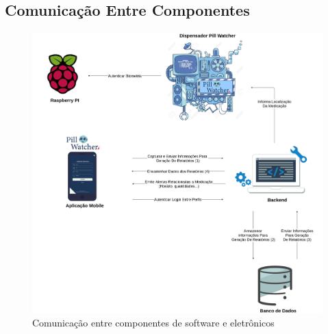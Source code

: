 \begin{apendicesenv}
\section{Comunicação Entre Componentes}
\begin{figure}[H]
    \centering
    \includegraphics[width=1.0\textwidth]{figuras/Comunicação Entre Componentes.png}
    \caption{Comunicação entre componentes de software e eletrônicos}
    \label{fig:Communication_between_components}
\end{figure}


\end{apendicesenv}
